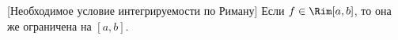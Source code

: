 [Необходимое условие интегрируемости по Риману]\label{Rimneob}
 	Если $f\in\Rim[a,b]$, то она же ограничена на $[a,b]$.
 